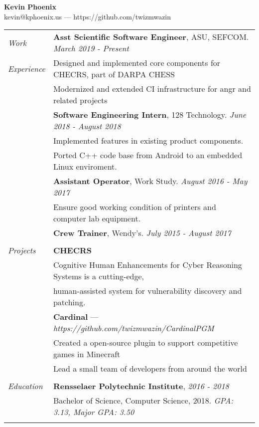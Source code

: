 \documentclass[letterpaper,10pt,oneside]{article}
\newcommand\entrytitle[1]{{\addfontfeature{LetterSpace=2}\textbf{#1}}}
\begin{document}
\begin{center}
    \Large{\textbf{Kevin Phoenix}} \normalsize \\
    \vspace{1mm}
    kevin@kphoenix.us --- https://github.com/twizmwazin
\end{center}


\noindent
\begin{tabular}{@{} l l}

  \textit{Work}
  & \entrytitle{Asst Scientific Software Engineer}, ASU, SEFCOM. \textit{March 2019 - Present} \\
  \textit{Experience}
  & Designed and implemented core components for CHECRS, part of DARPA CHESS \\
  & Modernized and extended CI infrastructure for angr and related projects \\
  & \entrytitle{Software Engineering Intern}, 128 Technology. \textit{June 2018 - August 2018} \\
  & Implemented features in existing product components. \\
  & Ported C++ code base from Android to an embedded Linux enviroment. \\
  & \entrytitle{Assistant Operator}, Work Study. \textit{August 2016 - May 2017} \\
  & Ensure good working condition of printers and computer lab equipment. \\
  & \entrytitle{Crew Trainer}, Wendy's. \textit{July 2015 - August 2017} \\
  & \\

  \textit{Projects}
  & \entrytitle{CHECRS} \\
  & Cognitive Human Enhancements for Cyber Reasoning Systems is a cutting-edge, \\
  & human-assisted system for vulnerability discovery and patching. \\
  & \entrytitle{Cardinal} --- \textit{https://github.com/twizmwazin/CardinalPGM} \\
  & Created a open-source plugin to support competitive games in Minecraft \\
  & Lead a small team of developers from around the world \\
  & \\

  \textit{Education}
  & \entrytitle{Rensselaer Polytechnic Institute}, \textit{2016 - 2018} \\
  & Bachelor of Science, Computer Science, 2018. \textit{GPA: 3.13, Major GPA: 3.50} \\
  & \\


\end{tabular}
\end{document}
